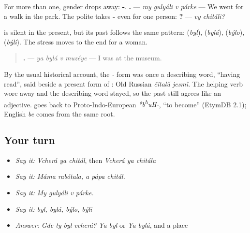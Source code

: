 \begin{grammarlens}[title={Grammar Lens: -\ru{ли} for more than one}]
For more than one, gender drops away: \textbf{-}. \textbf{   .} — \emph{my gulyáli v párke} — We went for a walk in the park. The polite \textbf{} takes \textbf{-} even for one person: \textbf{ ?} — \emph{vy chitáli?}
\end{grammarlens}

\begin{grammarlens}[title={Grammar Lens: \ru{был}, \ru{была}, \ru{было}, \ru{были}}]
\emph{} is silent in the present, but its past follows the same pattern: \textbf{} (\emph{byl}), \textbf{} (\emph{bylá}), \textbf{} (\emph{býlo}), \textbf{} (\emph{býli}). The stress moves to the end for a woman.

\begin{quote}
\textbf{   .} — \emph{ya bylá v muzéye} — I was at the museum.
\end{quote}
\end{grammarlens}

\begin{cousinweb}
By the usual historical account, the \emph{-} form was once a describing word, \textquotedblleft{}having read\textquotedblright{}, said beside a present form of \textbf{}: Old Russian \emph{čitalŭ jesmĭ}. The helping verb wore away and the describing word stayed, so the past still agrees like an adjective. \textbf{} goes back to Proto-Indo-European \emph{*b\textsuperscript{h}uH-}, \textquotedblleft{}to become\textquotedblright{} (EtymDB 2.1); English \emph{be} comes from the same root.
\end{cousinweb}

\subsection*{Your turn}
\begin{itemize}
\raggedright
  \item \emph{Say it:} \emph{Vcherá ya chitál}, then \emph{Vcherá ya chitála}
  \item \emph{Say it:} \emph{Máma rabótala, a pápa chitál.}
  \item \emph{Say it:} \emph{My gulyáli v párke.}
  \item \emph{Say it:} \emph{byl, bylá, býlo, býli}
  \item \emph{Answer:} \emph{Gde ty byl vcherá?} \emph{Ya byl} or \emph{Ya bylá}, and a place
\end{itemize}

